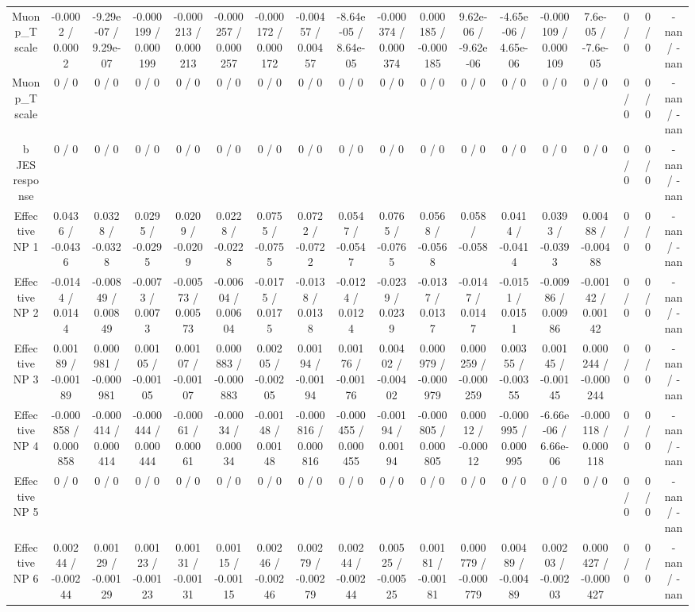 \documentclass[10pt]{article}
\begin{document}
\begin{table}[htbp]
\begin{center}
\begin{tabular}{|c|c|c|c|c|c|c|c|c|c|c|c|c|c|c|c|c|c|}
  Muon p_{T} scale & -0.0002 / 0.0002 & -9.29e-07 / 9.29e-07 & -0.000199 / 0.000199 & -0.000213 / 0.000213 & -0.000257 / 0.000257 & -0.000172 / 0.000172 & -0.00457 / 0.00457 & -8.64e-05 / 8.64e-05 & -0.000374 / 0.000374 & 0.000185 / -0.000185 & 9.62e-06 / -9.62e-06 & -4.65e-06 / 4.65e-06 & -0.000109 / 0.000109 & 7.6e-05 / -7.6e-05 & 0 / 0 & 0 / 0 & -nan / -nan \\ 
  Muon p_{T} scale & 0 / 0 & 0 / 0 & 0 / 0 & 0 / 0 & 0 / 0 & 0 / 0 & 0 / 0 & 0 / 0 & 0 / 0 & 0 / 0 & 0 / 0 & 0 / 0 & 0 / 0 & 0 / 0 & 0 / 0 & 0 / 0 & -nan / -nan \\ 
  b JES response & 0 / 0 & 0 / 0 & 0 / 0 & 0 / 0 & 0 / 0 & 0 / 0 & 0 / 0 & 0 / 0 & 0 / 0 & 0 / 0 & 0 / 0 & 0 / 0 & 0 / 0 & 0 / 0 & 0 / 0 & 0 / 0 & -nan / -nan \\ 
  Effective NP 1 & 0.0436 / -0.0436 & 0.0328 / -0.0328 & 0.0295 / -0.0295 & 0.0209 / -0.0209 & 0.0228 / -0.0228 & 0.0755 / -0.0755 & 0.0722 / -0.0722 & 0.0547 / -0.0547 & 0.0765 / -0.0765 & 0.0568 / -0.0568 & 0.058 / -0.058 & 0.0414 / -0.0414 & 0.0393 / -0.0393 & 0.00488 / -0.00488 & 0 / 0 & 0 / 0 & -nan / -nan \\ 
  Effective NP 2 & -0.0144 / 0.0144 & -0.00849 / 0.00849 & -0.0073 / 0.0073 & -0.00573 / 0.00573 & -0.00604 / 0.00604 & -0.0175 / 0.0175 & -0.0138 / 0.0138 & -0.0124 / 0.0124 & -0.0239 / 0.0239 & -0.0137 / 0.0137 & -0.0147 / 0.0147 & -0.0151 / 0.0151 & -0.00986 / 0.00986 & -0.00142 / 0.00142 & 0 / 0 & 0 / 0 & -nan / -nan \\ 
  Effective NP 3 & 0.00189 / -0.00189 & 0.000981 / -0.000981 & 0.00105 / -0.00105 & 0.00107 / -0.00107 & 0.000883 / -0.000883 & 0.00205 / -0.00205 & 0.00194 / -0.00194 & 0.00176 / -0.00176 & 0.00402 / -0.00402 & 0.000979 / -0.000979 & 0.000259 / -0.000259 & 0.00355 / -0.00355 & 0.00145 / -0.00145 & 0.000244 / -0.000244 & 0 / 0 & 0 / 0 & -nan / -nan \\ 
  Effective NP 4 & -0.000858 / 0.000858 & -0.000414 / 0.000414 & -0.000444 / 0.000444 & -0.00061 / 0.00061 & -0.00034 / 0.00034 & -0.00148 / 0.00148 & -0.000816 / 0.000816 & -0.000455 / 0.000455 & -0.00194 / 0.00194 & -0.000805 / 0.000805 & 0.00012 / -0.00012 & -0.000995 / 0.000995 & -6.66e-06 / 6.66e-06 & -0.000118 / 0.000118 & 0 / 0 & 0 / 0 & -nan / -nan \\ 
  Effective NP 5 & 0 / 0 & 0 / 0 & 0 / 0 & 0 / 0 & 0 / 0 & 0 / 0 & 0 / 0 & 0 / 0 & 0 / 0 & 0 / 0 & 0 / 0 & 0 / 0 & 0 / 0 & 0 / 0 & 0 / 0 & 0 / 0 & -nan / -nan \\ 
  Effective NP 6 & 0.00244 / -0.00244 & 0.00129 / -0.00129 & 0.00123 / -0.00123 & 0.00131 / -0.00131 & 0.00115 / -0.00115 & 0.00246 / -0.00246 & 0.00279 / -0.00279 & 0.00244 / -0.00244 & 0.00525 / -0.00525 & 0.00181 / -0.00181 & 0.000779 / -0.000779 & 0.00489 / -0.00489 & 0.00203 / -0.00203 & 0.000427 / -0.000427 & 0 / 0 & 0 / 0 & -nan / -nan \\ 

\end{tabular}
\end{center}
\end{table}
\end{document}
